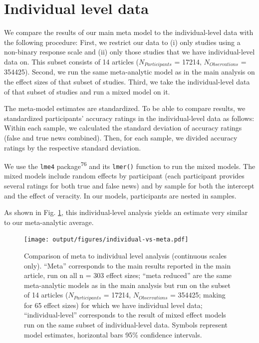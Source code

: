 \documentclass[
  man]{apa6}
\begin{document}
\FloatBarrier

\clearpage

\section{Individual level data}\label{individual-level}

\FloatBarrier

We compare the results of our main meta model to the individual-level data with the following procedure: First, we restrict our data to (i) only studies using a non-binary response scale and (ii) only those studies that we have individual-level data on. This subset consists of 14 articles (\(N_{Participants}\) = 17214, \(N_{Observations}\) = 354425). Second, we run the same meta-analytic model as in the main analysis on the effect sizes of that subset of studies. Third, we take the individual-level data of that subset of studies and run a mixed model on it.

The meta-model estimates are standardized. To be able to compare results, we standardized participants' accuracy ratings in the individual-level data as follows: Within each sample, we calculated the standard deviation of accuracy ratings (false and true news combined). Then, for each sample, we divided accuracy ratings by the respective standard deviation.

We use the \texttt{lme4} package\textsuperscript{76} and its \texttt{lmer()} function to run the mixed models. The mixed models include random effects by participant (each participant provides several ratings for both true and false news) and by sample for both the intercept and the effect of veracity. In our models, participants are nested in samples.

As shown in Fig. \ref{fig:individual-vs-meta}, this individual-level analysis yields an estimate very similar to our meta-analytic average.



\begin{figure}
\centering
\texttt{[image: output/figures/individual-vs-meta.pdf]}
\caption{\label{fig:individual-vs-meta}Comparison of meta to individual level analysis (continuous scales only). ``Meta'' corresponds to the main results reported in the main article, run on all n = 303 effect sizes; ``meta reduced'' are the same meta-analytic models as in the main analysis but run on the subset of 14 articles (\(N_{Participants}\) = 17214, \(N_{Observations}\) = 354425; making for 65 effect sizes) for which we have individual level data; ``individual-level'' corresponds to the result of mixed effect models run on the same subset of individual-level data. Symbols represent model estimates, horizontal bars 95\% confidence intervals.}
\end{figure}
\end{document}
